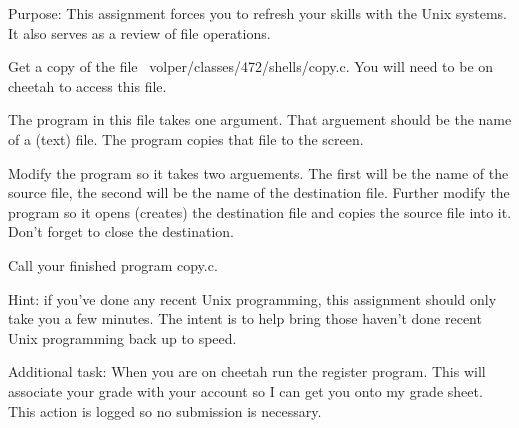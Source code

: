 

\parindent 0pt

Purpose: This assignment forces you to refresh your skills with the Unix
systems.
It also serves as a review of file operations.

Get a copy of the file {\ltt{}~volper/classes/472/shells/copy.c}.
You will need to be on {\ltt{}cheetah} to access this file.

The program in this file takes one argument. 
That arguement should be the name of a (text) file.
The program copies that file to the screen.

Modify the program so it takes two arguements.
The first will be the name of the source file, the second
will be the name of the destination file.
Further modify the program so it opens (creates) the destination
file and copies the source file into it.
Don't forget to close the destination.

Call your finished program {\ltt{}copy.c}.

Hint: if you've done any recent Unix programming, this assignment
should only take you a few minutes.
The intent is to help bring those haven't done recent Unix programming
back up to speed.

Additional task: When you are on {\ltt{}cheetah} run the {\ltt{}register}
program. This will associate your grade with your account so
I can get you onto my grade sheet.  This action is logged so
no submission is necessary.
\bye
